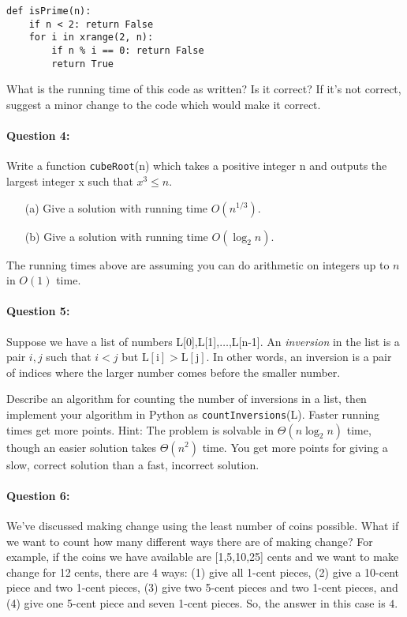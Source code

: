 \documentclass[11pt]{article}
\begin{document}
\begin{verbatim}
def isPrime(n):
    if n < 2: return False
    for i in xrange(2, n):
        if n % i == 0: return False
        return True
\end{verbatim}

What is the running time of this code as written?  Is it correct?  If
it's not correct, suggest a minor change to the code which would make
it correct.

\paragraph{Question 4:}
Write a function \texttt{cubeRoot}(n) which takes a positive integer n
and outputs the largest integer x such that $x^3 \le n$.

\begin{itemize}
\item[(a)] Give a solution with running time $O(n^{1/3})$.
\item[(b)] Give a solution with running time $O(\log_2 n)$.
\end{itemize}

The running times above are assuming you can do arithmetic on integers
up to $n$ in $O(1)$ time.

\paragraph{Question 5:}
Suppose we have a list of numbers L[0],L[1],$\ldots$,L[n-1].  An
{\em inversion} in the list is a pair $i,j$ such that $i<j$ but
$\mathrm{L[i]}> \mathrm{L[j]}$.  In other words, an inversion is a
pair of indices where the larger number comes before the smaller
number.

Describe an algorithm for counting the number of inversions in a list,
then implement your algorithm in Python as
\texttt{countInversions}(L).  Faster running times get more points.
Hint: The problem is solvable in $\Theta(n\log_2 n)$ time, though an
easier solution takes $\Theta(n^2)$ time.  You get more points for
giving a slow, correct solution than a fast, incorrect solution.

\paragraph{Question 6:}
We've discussed making change using the least number of coins
possible.  What if we want to count how many different ways there are
of making change?  For example, if the coins we have available are
[1,5,10,25] cents and we want to make change for 12 cents, there are 4
ways: (1) give all 1-cent pieces, (2) give a 10-cent piece and two
1-cent pieces, (3) give two 5-cent pieces and two 1-cent pieces, and
(4) give one 5-cent piece and seven 1-cent pieces.  So, the answer in
this case is $4$.
\end{document}
